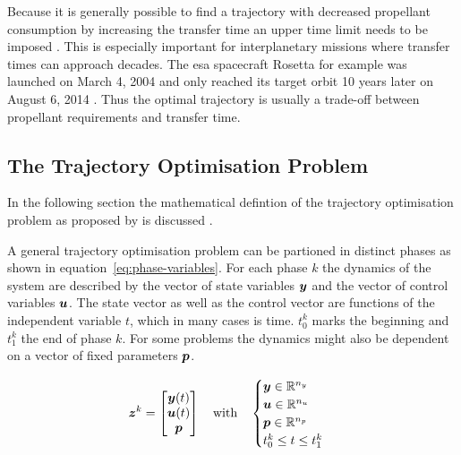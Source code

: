 Because it is generally possible to find a trajectory with decreased propellant consumption by increasing the transfer time an upper time limit needs to be imposed \autocite[p. 1]{conway-problem-2014}.
This is especially important for interplanetary missions where transfer times can approach decades.
The \ac{esa} spacecraft Rosetta for example was launched on March 4, 2004 and only reached its target orbit 10 years later on August 6, 2014 \autocite{glassmeier-rosetta-2007}.
Thus the optimal trajectory is usually a trade-off between propellant requirements and transfer time.

\subsection{The Trajectory Optimisation Problem}
\label{sec:trajectory-optimisation-problem}

In the following section the mathematical defintion of the trajectory optimisation problem as proposed by \citeauthor{betts-survey-1998} is discussed \autocite[pp. 1-2]{betts-survey-1998}.

A general trajectory optimisation problem can be partioned in distinct phases as shown in equation~\ref{eq:phase-variables}.
For each phase $k$ the dynamics of the system are described by the vector of state variables $\boldsymbol{y}$ and the vector of control variables $\boldsymbol{u}$.
The state vector as well as the control vector are functions of the independent variable $t$, which in many cases is time.
$t_0^k$ marks the beginning and $t_1^k$ the end of phase $k$.
For some problems the dynamics might also be dependent on a vector of fixed parameters $\boldsymbol{p}$.

\begin{equation}
    \boldsymbol{z}^k = \begin{bmatrix}
            \boldsymbol{y}(t) \\
            \boldsymbol{u}(t) \\
            \boldsymbol{p}
        \end{bmatrix} \quad \text{with} \quad \begin{cases}
            \boldsymbol{y} \in \mathbb{R}^{n_y} \\
            \boldsymbol{u} \in \mathbb{R}^{n_u} \\
            \boldsymbol{p} \in \mathbb{R}^{n_p} \\
            t_0^k \leq t \leq t_1^k
        \end{cases}
    \label{eq:phase-variables}
\end{equation}

